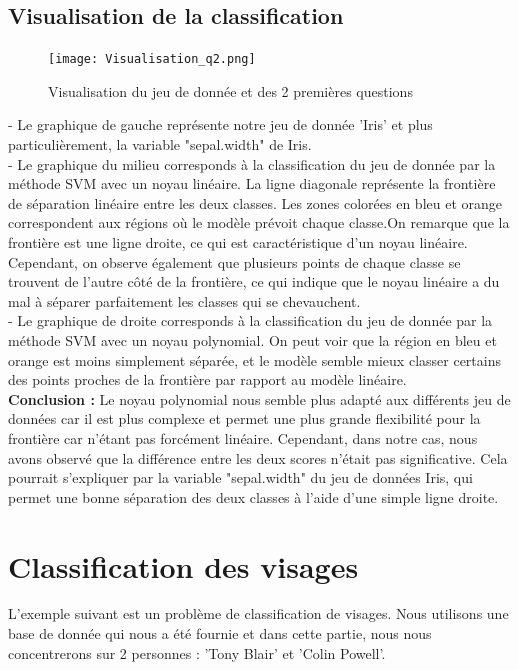 \documentclass{article}
\begin{document}
\subsection{Visualisation de la classification}

\begin{figure}[H]
    \centering
    \texttt{[image: Visualisation\_q2.png]}
    \caption{Visualisation du jeu de donnée et des 2 premières questions}
    \label{fig2}
\end{figure}

- Le graphique de gauche représente notre jeu de donnée 'Iris' et plus particulièrement, la variable "sepal.width" de Iris.\\
- Le graphique du milieu corresponds à la classification du jeu de donnée par la méthode SVM avec un noyau linéaire. La ligne diagonale représente la frontière de séparation linéaire entre les deux classes. Les zones colorées en bleu et orange correspondent aux régions où le modèle prévoit chaque classe.On remarque que la frontière est une ligne droite, ce qui est caractéristique d'un noyau linéaire. Cependant, on observe également que plusieurs points de chaque classe se trouvent de l'autre côté de la frontière, ce qui indique que le noyau linéaire a du mal à séparer parfaitement les classes qui se chevauchent.\\
- Le graphique de droite corresponds à la classification du jeu de donnée par la méthode SVM avec un noyau polynomial. On peut voir que la région en bleu et orange est moins simplement séparée, et le modèle semble mieux classer certains des points proches de la frontière par rapport au modèle linéaire.\\

\textbf{Conclusion :} Le noyau polynomial nous semble plus adapté aux différents jeu de données car il est plus complexe et permet une plus grande flexibilité pour la frontière car n'étant pas forcément linéaire. Cependant, dans notre cas, nous avons observé que la différence entre les deux scores n'était pas significative. Cela pourrait s'expliquer par la variable "sepal.width" du jeu de données Iris, qui permet une bonne séparation des deux classes à l'aide d'une simple ligne droite.

\newpage

\section{Classification des visages }
L'exemple suivant est un problème de classification de visages. Nous utilisons une base de donnée qui nous a été fournie et dans cette partie, nous nous concentrerons sur 2 personnes : 'Tony Blair' et 'Colin Powell'.
\end{document}
